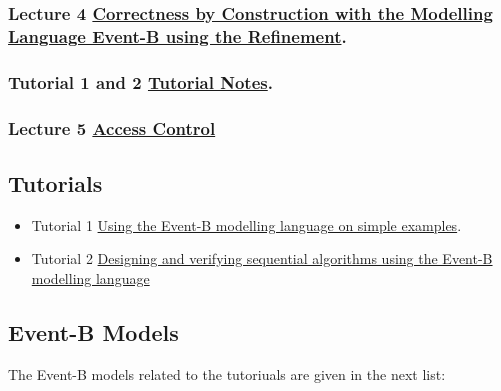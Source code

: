 \documentclass[ 12pt]{article}
\begin{document}
  

  \subsubsection{Lecture 4
    \href{http://mery54.github.io/teaching/mosos/lecturesnotes/mcfsi-maynooth-lect2.pdf}{Correctness by Construction with the  
      Modelling Language Event-B using the Refinement}.}
  \label{sec:lect-3-hrefhttp:m}

  \subsubsection{Tutorial  1 and 2
    \href{http://mery54.github.io/teaching/mosos/lecturesnotes/mcfsi-maynooth-tut.pdf}{Tutorial
      Notes}.}
\label{sec:tuthrefhttp:m}


\subsubsection{ Lecture 5 
    \href{http://mery54.github.io/teaching/mosos/lecturesnotes/mcfsi-maynooth-lect3.pdf}{Access 
      Control }
}



\subsection{Tutorials}

\begin{itemize}
 
  \item[]   Tutorial 1 
    \href{http://mery54.github.io/teaching/mosos/lecturesnotes/mastertutorial1.pdf}{Using 
      the Event-B modelling language on simple examples}.


    
  \item[]   Tutorial 2
    \href{http://mery54.github.io/teaching/mosos/lecturesnotes/mastertutorial2.pdf}{Designing
      and verifying sequential algorithms using the Event-B modelling      language}
  
  \end{itemize}

    \subsection{Event-B Models}
\label{sec:event-b-models}


The Event-B models related to the tutoriuals are given in the next list: 
\end{document}
